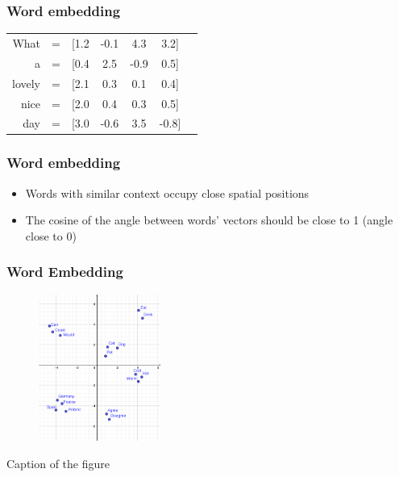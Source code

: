 \begin{frame}
\frametitle{Word embedding}

\begin{table}[h]
	\hspace{15mm}
	\huge
	\begin{tabular}{rcccccc}
		What & = & [1.2 & -0.1 & 4.3 & 3.2] \\
		a & = & [0.4 & 2.5 & -0.9 & 0.5] \\
		lovely & = & [2.1 & 0.3 & 0.1& 0.4] \\
		nice & = & [2.0& 0.4& 0.3& 0.5] \\
		day & = & [3.0& -0.6& 3.5& -0.8] \\
	\end{tabular}
\end{table}



\end{frame}

\begin{frame}
\frametitle{Word embedding}

	\begin{itemize}
		\item Words with similar context occupy close spatial positions
		\item The cosine of the angle between words' vectors should be close to 1 (angle close to 0)
	\end{itemize}

\end{frame}

\begin{frame}
	\frametitle{Word Embedding}

	\begin{figure}
		\includegraphics[width=4cm]{./figures/Groups}

	\end{figure}
		\begin{center}
		{Caption of the figure}
		\end{center}
	\vspace{-0.5cm}



\end{frame}

